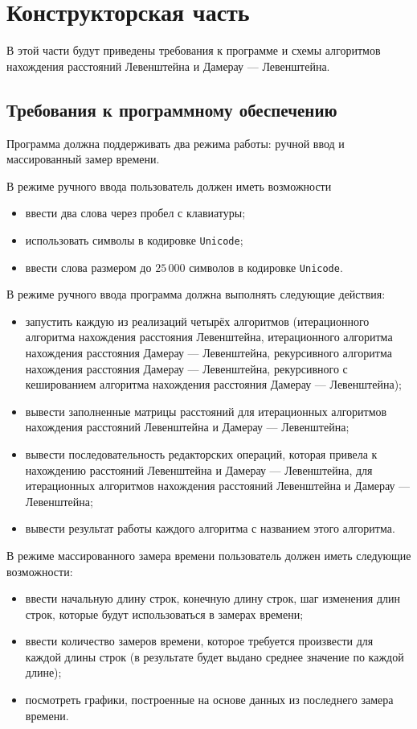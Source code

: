 \section{Конструкторская часть}

В этой части будут приведены требования к программе и схемы алгоритмов нахождения расстояний Левенштейна и Дамерау --- Левенштейна.

\subsection{Требования к программному обеспечению}

Программа должна поддерживать два режима работы: ручной ввод и массированный замер времени.

В режиме ручного ввода пользователь должен иметь возможности
\begin{itemize}
    \item ввести два слова через пробел с клавиатуры;
    \item использовать символы в кодировке \texttt{Unicode};
    \item ввести слова размером до $25\,000$ символов в кодировке \texttt{Unicode}.
\end{itemize}

В режиме ручного ввода программа должна выполнять следующие действия:
\begin{itemize}
    \item запустить каждую из реализаций четырёх алгоритмов (итерационного алгоритма нахождения расстояния Левенштейна, итерационного алгоритма нахождения расстояния Дамерау --- Левенштейна, рекурсивного алгоритма нахождения расстояния Дамерау --- Левенштейна, рекурсивного с кешированием алгоритма нахождения расстояния Дамерау --- Левенштейна);
    \item вывести заполненные матрицы расстояний для итерационных алгоритмов нахождения расстояний Левенштейна и Дамерау --- Левенштейна;
    \item вывести последовательность редакторских операций, которая привела к нахождению расстояний Левенштейна и Дамерау --- Левенштейна, для итерационных алгоритмов нахождения расстояний Левенштейна и Дамерау --- Левенштейна;
    \item вывести результат работы каждого алгоритма с названием этого алгоритма.
\end{itemize}

В режиме массированного замера времени пользователь должен иметь следующие возможности:
\begin{itemize}
    \item ввести начальную длину строк, конечную длину строк, шаг изменения длин строк, которые будут использоваться в замерах времени;
    \item ввести количество замеров времени, которое требуется произвести для каждой длины строк (в результате будет выдано среднее значение по каждой длине);
    \item посмотреть графики, построенные на основе данных из последнего замера времени.
\end{itemize}

